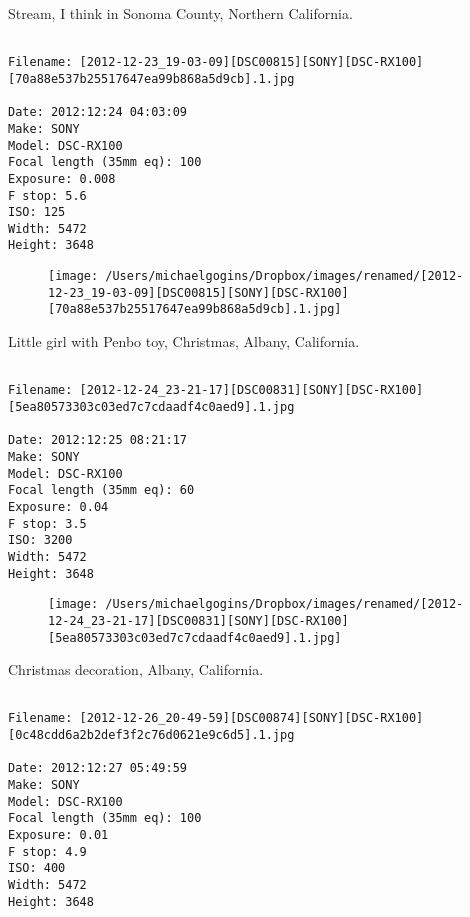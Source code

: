 \clearpage
\onecolumn
\noindent Stream, I think in Sonoma County, Northern California.
\noindent
\begin{lstlisting}

Filename: [2012-12-23_19-03-09][DSC00815][SONY][DSC-RX100][70a88e537b25517647ea99b868a5d9cb].1.jpg

Date: 2012:12:24 04:03:09
Make: SONY
Model: DSC-RX100
Focal length (35mm eq): 100
Exposure: 0.008
F stop: 5.6
ISO: 125
Width: 5472
Height: 3648
\end{lstlisting}
\clearpage

\begin{figure}
\texttt{[image: /Users/michaelgogins/Dropbox/images/renamed/[2012-12-23\_19-03-09][DSC00815][SONY][DSC-RX100][70a88e537b25517647ea99b868a5d9cb].1.jpg]}
\end{figure}
    
\clearpage
\onecolumn
\noindent Little girl with Penbo toy, Christmas, Albany, California.
\noindent
\begin{lstlisting}

Filename: [2012-12-24_23-21-17][DSC00831][SONY][DSC-RX100][5ea80573303c03ed7c7cdaadf4c0aed9].1.jpg

Date: 2012:12:25 08:21:17
Make: SONY
Model: DSC-RX100
Focal length (35mm eq): 60
Exposure: 0.04
F stop: 3.5
ISO: 3200
Width: 5472
Height: 3648
\end{lstlisting}
\clearpage

\begin{figure}
\texttt{[image: /Users/michaelgogins/Dropbox/images/renamed/[2012-12-24\_23-21-17][DSC00831][SONY][DSC-RX100][5ea80573303c03ed7c7cdaadf4c0aed9].1.jpg]}
\end{figure}
    
\clearpage
\onecolumn
\noindent Christmas decoration, Albany, California.
\noindent
\begin{lstlisting}

Filename: [2012-12-26_20-49-59][DSC00874][SONY][DSC-RX100][0c48cdd6a2b2def3f2c76d0621e9c6d5].1.jpg

Date: 2012:12:27 05:49:59
Make: SONY
Model: DSC-RX100
Focal length (35mm eq): 100
Exposure: 0.01
F stop: 4.9
ISO: 400
Width: 5472
Height: 3648
\end{lstlisting}
\clearpage

